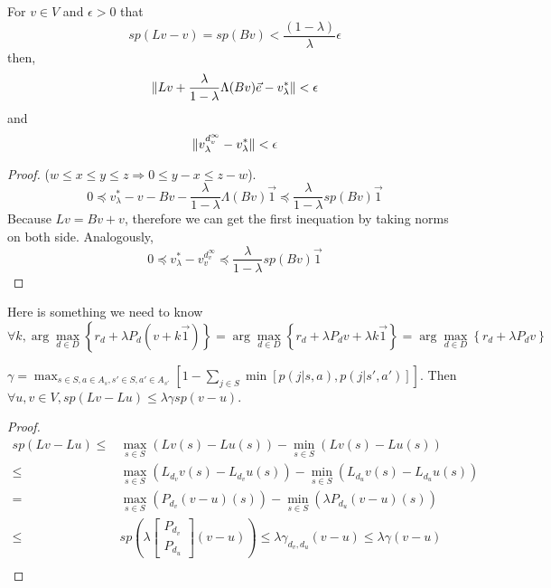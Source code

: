 \begin{proposition}
    For $ v \in V $ and $ \epsilon > 0 $ that
    \[
        sp(Lv-v) = sp(Bv) < \frac{(1-\lambda)}{\lambda} \epsilon
    \]
    then,
    \[
        \Arrowvert Lv + \frac{\lambda}{1-\lambda} \Lambda(Bv) \vec{e} - v^*_\lambda \Arrowvert < \epsilon
    \]
    and 
    \[
         \Arrowvert v^{d^\infty_v}_\lambda - v^*_\lambda \Arrowvert < \epsilon
    \]
    \begin{proof} ($ w \le x \le y \le z \Rightarrow 0 \le y-x \le z-w $).
        \[
            0\preceq v^*_\lambda - v - Bv - \frac{\lambda}{1-\lambda} \Lambda(Bv) \vec{1} \preceq \frac{\lambda}{1-\lambda} sp(Bv) \vec{1}
        \]
        Because $ Lv = Bv + v $, therefore we can get the first inequation by taking norms on both side. 
        Analogously,
        \[
            0 \preceq v^*_{\lambda} - v^{d^\infty_v}_{v} \preceq \frac{\lambda}{1-\lambda} sp(Bv) \vec{1}
        \]
    \end{proof}
\end{proposition}

Here is something we need to know
\[
    \forall k, \arg\max_{d \in D} \left\{ r_d + \lambda P_d (v + k \vec{1}) \right\}
    = \arg\max_{d \in D} \left\{ r_d + \lambda P_d v + \lambda k \vec{1} \right\}
    = \arg\max_{d \in D} \left\{ r_d + \lambda P_d v \right\}
\]
\begin{theorem}
    $ \gamma = \max_{s\in S, a \in A_s, s' \in S, a' \in A_{s'}} \left[ 1- \sum^{}_{j \in S} \min \left[ p(j | s, a), p(j | s', a') \right] \right] $.
    Then $ \forall u, v \in V, sp(Lv - Lu) \le \lambda \gamma sp(v - u) $.
    \begin{proof}
        \begin{align*}
            sp(Lv - Lu) \le& \max_{s \in S}(L v(s) - L u(s)) - \min_{s \in S} (L v(s) - L u(s)) \\
            \le&\max_{s \in S}(L_{d_v} v(s) - L_{d_v} u(s)) - \min_{s \in S} (L_{d_u} v(s) - L_{d_u} u(s)) \\
            =& \max_{s \in S}(P_{d_v}(v - u) (s)) - \min_{s \in S} (\lambda P_{d_u}(v-u) (s)) \\
            \le& sp\left(\lambda \begin{bmatrix} P_{d_v} \\ P_{d_u} \end{bmatrix} (v-u)\right) \le \lambda \gamma_{d_v, d_u}(v - u) \le \lambda \gamma(v-u) \\
        \end{align*}
    \end{proof}
\end{theorem}

